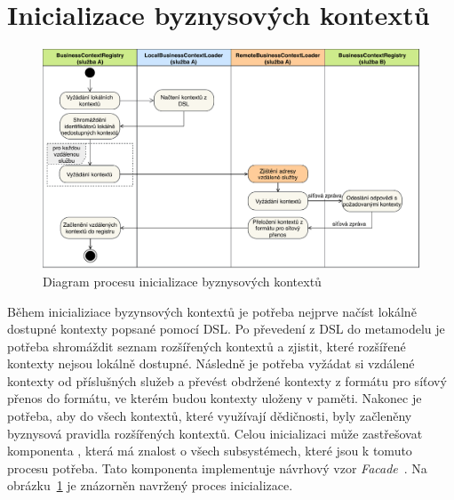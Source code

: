 \section{Inicializace byznysových kontextů}

\begin{figure}
    \centering
    \includegraphics[keepaspectratio=true, width=\linewidth]{figures/business-context-loading.pdf}
    \caption{Diagram procesu inicializace byznysov\'ych kontextů}
    \label{fig:business-context-loading}
\end{figure}

Během inicializiace byzynsových kontextů je potřeba nejprve načíst lokálně dostupné kontexty popsané pomocí \gls{DSL}.
Po převedení z \gls{DSL} do metamodelu je potřeba shromáždit seznam rozšířených kontextů a zjistit, které
rozšířené kontexty nejsou lokálně dostupné. Následně je potřeba vyžádat si vzdálené kontexty od příslušných služeb
a převést obdržené kontexty z formátu pro síťový přenos do formátu, ve kterém budou kontexty uloženy v paměti.
Nakonec je potřeba, aby do všech kontextů, které využívají dědičnosti, byly začleněny byznysová pravidla
rozšířených kontextů. Celou inicializaci může zastřešovat komponenta , která
má znalost o všech subsystémech, které jsou k tomuto procesu potřeba. Tato komponenta implementuje
návrhový vzor \textit{Facade}~\cite{fowler2002patterns}. Na obrázku~\ref{fig:business-context-loading} je znázorněn
navržený proces inicializace.

